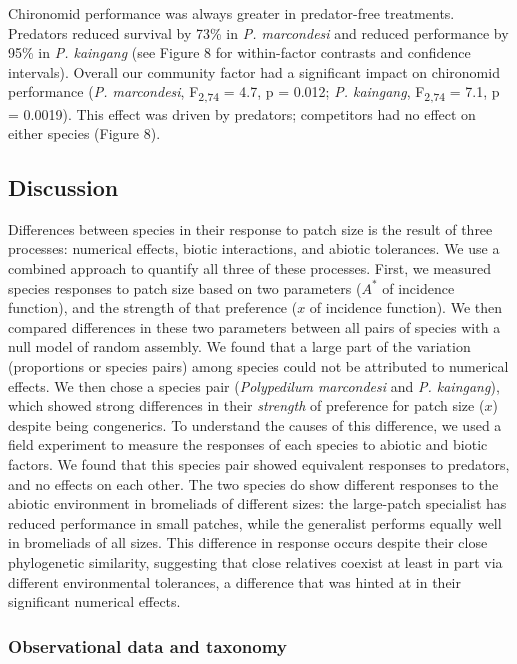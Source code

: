 Chironomid performance was always greater in predator-free treatments.
Predators reduced survival by 73\% in \emph{P. marcondesi} and reduced
performance by 95\% in \emph{P. kaingang} (see Figure 8 for
within-factor contrasts and confidence intervals). Overall our community
factor had a significant impact on chironomid performance (\emph{P.
marcondesi}, F\textsubscript{2,74} = 4.7, p = 0.012; \emph{P. kaingang},
F\textsubscript{2,74} = 7.1, p = 0.0019). This effect was driven by
predators; competitors had no effect on either species (Figure 8).

\subsection{Discussion}\label{discussion}

Differences between species in their response to patch size is the
result of three processes: numerical effects, biotic interactions, and
abiotic tolerances. We use a combined approach to quantify all three of
these processes. First, we measured species responses to patch size
based on two parameters (\(A^{*}\) of incidence function), and the
strength of that preference (\(x\) of incidence function). We then
compared differences in these two parameters between all pairs of
species with a null model of random assembly. We found that a large part
of the variation (proportions or species pairs) among species could not
be attributed to numerical effects. We then chose a species pair
(\emph{Polypedilum marcondesi} and \emph{P. kaingang}), which showed
strong differences in their \emph{strength} of preference for patch size
(\(x\)) despite being congenerics. To understand the causes of this
difference, we used a field experiment to measure the responses of each
species to abiotic and biotic factors. We found that this species pair
showed equivalent responses to predators, and no effects on each other.
The two species do show different responses to the abiotic environment
in bromeliads of different sizes: the large-patch specialist has reduced
performance in small patches, while the generalist performs equally well
in bromeliads of all sizes. This difference in response occurs despite
their close phylogenetic similarity, suggesting that close relatives
coexist at least in part via different environmental tolerances, a
difference that was hinted at in their significant numerical effects.

\subsubsection{Observational data and
taxonomy}\label{observational-data-and-taxonomy}

